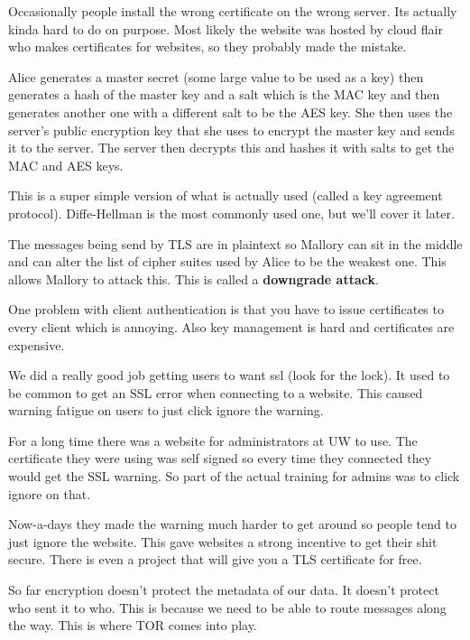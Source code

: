 \documentclass{article}
\begin{document}
Occasionally people install the wrong certificate on the wrong server. Its actually kinda hard to do on purpose. Most likely the website was hosted by cloud flair who makes certificates for websites, so they probably made the mistake.


Alice generates a master secret (some large value to be used as a key) then generates a hash of the master key and a salt which is the MAC key and then generates another one with a different salt to be the AES key. She then uses the server's public encryption key that she uses to encrypt the master key and sends it to the server. The server then decrypts this and hashes it with salts to get the MAC and AES keys. 

This is a super simple version of what is actually used (called a key agreement protocol). Diffe-Hellman is the most commonly used one, but we'll cover it later.


The messages being send by TLS are in plaintext so Mallory can sit in the middle and can alter the list of cipher suites used by Alice to be the weakest one. This allows Mallory to attack this. This is called a \textbf{downgrade attack}.

One problem with client authentication is that you have to issue certificates to every client which is annoying. Also key management is hard and certificates are expensive.


We did a really good job getting users to want ssl (look for the lock). It used to be common to get an SSL error when connecting to a website. This caused warning fatigue on users to just click ignore the warning.

For a long time there was a website for administrators at UW to use. The certificate they were using was self signed so every time they connected they would get the SSL warning. So part of the actual training for admins was to click ignore on that.

Now-a-days they made the warning much harder to get around so people tend to just ignore the website. This gave websites a strong incentive to get their shit secure. There is even a project that will give you a TLS certificate for free.


So far encryption doesn't protect the metadata of our data. It doesn't protect who sent it to who. This is because we need to be able to route messages along the way. This is where TOR comes into play.
\end{document}
